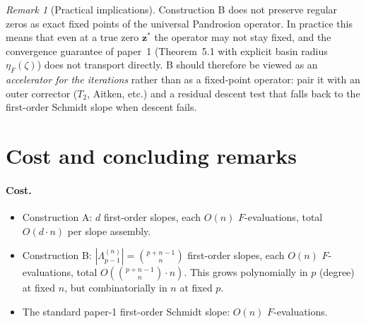 \documentclass[11pt,a4paper]{article}
\theoremstyle{definition}
\theoremstyle{remark}
\newtheorem{remark}[theorem]{Remark}
\newcommand{\zb}{\mathbf{z}}
\begin{document}
\begin{remark}[Practical implications]
Construction B does not preserve regular zeros as exact fixed points of the
universal Pandrosion operator. In practice this means that even at a true
zero $\zb^*$ the operator may not stay fixed, and the convergence guarantee
of paper~1 (Theorem~5.1 with explicit basin radius $\eta_F(\zeta)$) does not
transport directly. B should therefore be viewed as an \emph{accelerator
for the iterations} rather than as a fixed-point operator: pair it with an
outer corrector ($T_2$, Aitken, etc.) and a residual descent test that falls
back to the first-order Schmidt slope when descent fails.
\end{remark}

\section{Cost and concluding remarks}

\paragraph{Cost.}
\begin{itemize}
\item Construction A: $d$ first-order slopes, each $O(n)$ $F$-evaluations,
  total $O(d \cdot n)$ per slope assembly.
\item Construction B: $|\Lambda_{p-1}^{(n)}| = \binom{p+n-1}{n}$ first-order
  slopes, each $O(n)$ $F$-evaluations, total $O(\binom{p+n-1}{n} \cdot n)$.
  This grows polynomially in $p$ (degree) at fixed $n$, but combinatorially
  in $n$ at fixed $p$.
\item The standard paper-1 first-order Schmidt slope: $O(n)$ $F$-evaluations.
\end{itemize}
\end{document}
